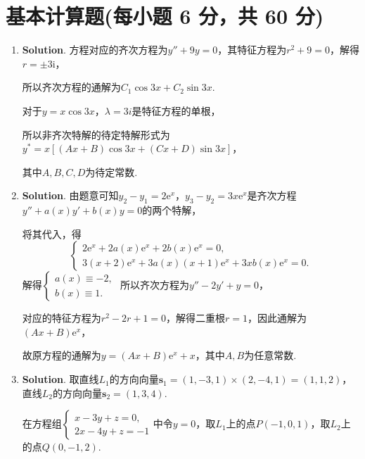 \documentclass[../main.tex]{subfiles}
\begin{document}
\section{基本计算题(每小题 6 分，共 60 分)}
\begin{enumerate}
    \item \textbf{Solution}. 方程对应的齐次方程为$y''+9y=0$，其特征方程为$r^{2}+9
              =0$，解得$r=\pm 3\mathrm{i}$，

          所以齐次方程的通解为$C_{1}\cos 3x + C_{2}\sin 3x$.

          对于$y=x\cos 3x$，$\lambda = 3i$是特征方程的单根，

          所以非齐次特解的待定特解形式为$y^{*}=x\left[(Ax+B)\cos 3x + (Cx+D)\sin 3x\right
              ]$，

          其中$A,B,C,D$为待定常数.

    \item \textbf{Solution}. 由题意可知$y_{2}-y_{1}=2\mathrm{e}^{x}$，$y_{3}-y_{2}
              =3x\mathrm{e}^{x}$是齐次方程$y''+a(x)y'+b(x)y=0$的两个特解，

          将其代入，得
          \[
              \begin{cases}
                  2\mathrm{e}^{x}+2a(x)\mathrm{e}^{x}+2b(x)\mathrm{e}^{x}=0, \\
                  3(x+2)\mathrm{e}^{x}+3a(x)(x+1)\mathrm{e}^{x}+3xb(x)\mathrm{e}^{x}=0.
              \end{cases}
          \]
          解得$\begin{cases}
                  a(x)\equiv -2, \\
                  b(x)\equiv 1.
              \end{cases}$ 所以齐次方程为$y''-2y'+y=0$，

          对应的特征方程为$r^{2}-2r+1=0$，解得二重根$r=1$，因此通解为$(Ax+B)\mathrm{e}^{x}$，

          故原方程的通解为$y = (Ax+B)\mathrm{e}^{x}+ x$，其中$A,B$为任意常数.

    \item \textbf{Solution}. 取直线$L_{1}$的方向向量$\boldsymbol{s}_{1}=(1,-3,1)\times
              (2,-4,1)=(1,1,2)$，直线$L_{2}$的方向向量$\boldsymbol{s}_{2}=(1,3,4)$.

          在方程组$\begin{cases}
                  x-3y+z=0, \\
                  2x-4y+z=-1
              \end{cases}$中令$y=0$，取$L_{1}$上的点$P(-1,0,1)$，取$L_{2}$上的点$Q(0,-1,2
              )$.


\end{enumerate}
\end{document}
